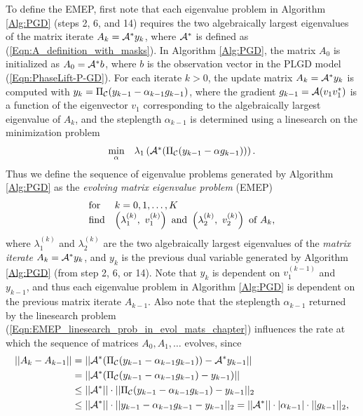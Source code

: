 To define the EMEP, first note that each eigenvalue problem in Algorithm \ref{Alg:PGD} (steps 2, 6, and 14) requires the two algebraically largest eigenvalues of the matrix iterate $A_k = {\mathcal A}^*y_k$, where ${\mathcal A}^*$ is defined as (\ref{Eqn:A_definition_with_masks}).
In Algorithm \ref{Alg:PGD}, the matrix $A_0$ is initialized as $A_0 = {\mathcal A}^*b$, where $b$ is the observation vector in the PLGD model (\ref{Eqn:PhaseLift-P-GD}).
For each iterate $k >0$, the update matrix $A_k = {\mathcal A}^*y_k$ is computed with $y_k = \Pi_{{\mathcal C}}(y_{k-1}- \alpha_{k-1}  g_{k-1})$, where the gradient $g_{k-1} = {\mathcal A}(v_1 v_1^*)$ is a function of the eigenvector $v_1$ corresponding to the algebraically largest eigenvalue of $A_k$, and the steplength $\alpha_{k-1}$ is determined using a linesearch on the minimization problem
\begin{equation}			\label{Eqn:EMEP_linesearch_prob_in_evol_mats_chapter}
\begin{array}{ll}
\min\limits_{\substack{\alpha}}
	&	\lambda_1 \left( {\mathcal A}^* ( \Pi_{\mathcal C} ( y_{k-1} - \alpha g_{k-1} ) )  \right).
\end{array}
\end{equation}
Thus we define the sequence of eigenvalue problems generated by Algorithm \ref{Alg:PGD} as the \textit{evolving matrix eigenvalue problem} (EMEP)
\begin{equation}		\label{Eqn:EMEP_PLGD}
\begin{array}{ll}
\textnormal{for}
	&	k = 0, 1, \ldots, K		\\
\textnormal{find}	
	&	\left( \lambda^{(k)}_1, \ v^{(k)}_1 \right) \textnormal{ and } \left( \lambda^{(k)}_2, \ v^{(k)}_2 \right) \textnormal{ of } A_k,
\end{array}
\end{equation}
where $\lambda^{(k)}_1$ and $\lambda^{(k)}_2$ are the two algebraically largest eigenvalues of the \textit{matrix iterate} $A_k = {\mathcal A}^*y_k$, and $y_k$ is the previous dual variable generated by Algorithm \ref{Alg:PGD} (from step 2, 6, or 14).
Note that $y_k$ is dependent on $v_1^{(k-1)}$ and $y_{k-1}$, and thus each eigenvalue problem in Algorithm \ref{Alg:PGD} is dependent on the previous matrix iterate $A_{k-1}$.
Also note that the steplength $\alpha_{k-1}$ returned by the linesearch problem (\ref{Eqn:EMEP_linesearch_prob_in_evol_mats_chapter}) influences the rate at which the sequence of matrices $A_0, A_1, \ldots$ evolves, since
\begin{equation}
\begin{split}
||A_k - A_{k-1}||
	& = ||{\mathcal A}^* ( \Pi_{\mathcal C} ( y_{k-1} - \alpha_{k-1} g_{k-1})) - {\mathcal A}^*y_{k-1} ||		\\
	& = ||{\mathcal A}^* ( \Pi_{\mathcal C} ( y_{k-1} - \alpha_{k-1} g_{k-1}) - y_{k-1}) ||		\\
	& \leq ||{\mathcal A}^*|| \cdot || \Pi_{\mathcal C} ( y_{k-1} - \alpha_{k-1} g_{k-1}) - y_{k-1} ||_2	 	\\
	& \leq ||{\mathcal A}^*|| \cdot || y_{k-1} - \alpha_{k-1} g_{k-1} - y_{k-1} ||_2 
		= ||{\mathcal A}^*|| \cdot |\alpha_{k-1}| \cdot	||g_{k-1}||_2,	\\
\end{split}
\end{equation}

